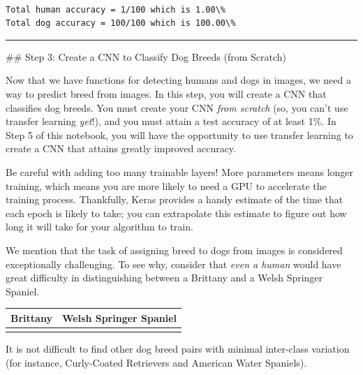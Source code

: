 \documentclass[11pt]{article}
\begin{document}
    \begin{center}
    \end{center}
    { \hspace*{\fill} \\}
    
    \begin{Verbatim}[commandchars=\\\{\}]
Total human accuracy = 1/100 which is 1.00\%
Total dog accuracy = 100/100 which is 100.00\%

    \end{Verbatim}

    \begin{center}\rule{0.5\linewidth}{\linethickness}\end{center}

 \#\# Step 3: Create a CNN to Classify Dog Breeds (from Scratch)

Now that we have functions for detecting humans and dogs in images, we
need a way to predict breed from images. In this step, you will create a
CNN that classifies dog breeds. You must create your CNN \emph{from
scratch} (so, you can't use transfer learning \emph{yet}!), and you must
attain a test accuracy of at least 1\%. In Step 5 of this notebook, you
will have the opportunity to use transfer learning to create a CNN that
attains greatly improved accuracy.

Be careful with adding too many trainable layers! More parameters means
longer training, which means you are more likely to need a GPU to
accelerate the training process. Thankfully, Keras provides a handy
estimate of the time that each epoch is likely to take; you can
extrapolate this estimate to figure out how long it will take for your
algorithm to train.

We mention that the task of assigning breed to dogs from images is
considered exceptionally challenging. To see why, consider that
\emph{even a human} would have great difficulty in distinguishing
between a Brittany and a Welsh Springer Spaniel.

\begin{longtable}[]{@{}ll@{}}
\toprule
Brittany & Welsh Springer Spaniel\tabularnewline
\midrule
\endhead
&\tabularnewline
\bottomrule
\end{longtable}

It is not difficult to find other dog breed pairs with minimal
inter-class variation (for instance, Curly-Coated Retrievers and
American Water Spaniels).
\end{document}
